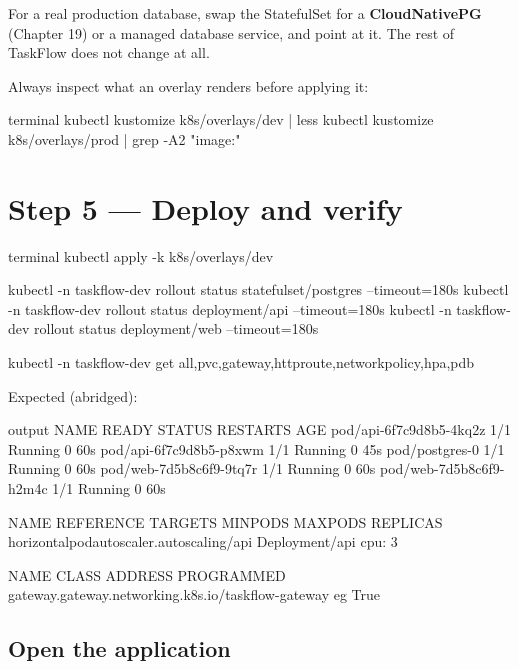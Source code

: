\begin{protip}
For a real production database, swap the StatefulSet for a
\textbf{CloudNativePG}  (Chapter 19) or a managed database service,
and point  at it. The rest of TaskFlow does not change at all.
\end{protip}

Always inspect what an overlay renders before applying it:

\begin{bashcode}{terminal}
kubectl kustomize k8s/overlays/dev | less
kubectl kustomize k8s/overlays/prod | grep -A2 "image:"
\end{bashcode}

\section{Step 5 --- Deploy and verify}

\begin{bashcode}{terminal}
kubectl apply -k k8s/overlays/dev

kubectl -n taskflow-dev rollout status statefulset/postgres --timeout=180s
kubectl -n taskflow-dev rollout status deployment/api --timeout=180s
kubectl -n taskflow-dev rollout status deployment/web --timeout=180s

kubectl -n taskflow-dev get all,pvc,gateway,httproute,networkpolicy,hpa,pdb
\end{bashcode}

Expected (abridged):

\begin{plaincode}{output}
NAME                       READY   STATUS    RESTARTS   AGE
pod/api-6f7c9d8b5-4kq2z    1/1     Running   0          60s
pod/api-6f7c9d8b5-p8xwm    1/1     Running   0          45s
pod/postgres-0             1/1     Running   0          60s
pod/web-7d5b8c6f9-9tq7r    1/1     Running   0          60s
pod/web-7d5b8c6f9-h2m4c    1/1     Running   0          60s

NAME                                          REFERENCE        TARGETS       MINPODS   MAXPODS   REPLICAS
horizontalpodautoscaler.autoscaling/api       Deployment/api   cpu: 3%

NAME                                                 CLASS   ADDRESS   PROGRAMMED
gateway.gateway.networking.k8s.io/taskflow-gateway   eg                True
\end{plaincode}

\subsection{Open the application}

